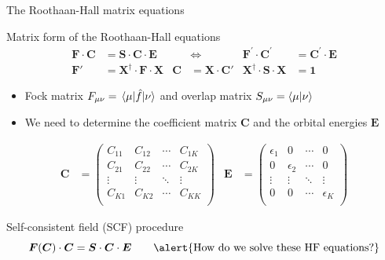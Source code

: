 \documentclass[aspectratio=169,9pt]{beamer}
\newcommand{\bC}{\boldsymbol{C}}
\newcommand{\bE}{\boldsymbol{E}}
\newcommand{\bI}{\boldsymbol{1}}
\newcommand{\bS}{\boldsymbol{S}}
\newcommand{\bF}{\boldsymbol{F}}
\newcommand{\bX}{\boldsymbol{X}}
\newcommand{\hf}{\hat{f}}
\begin{document}
\begin{frame}{The Roothaan-Hall matrix equations}
	\small
	\begin{block}{Matrix form of the Roothaan-Hall equations}
		\begin{align}
			\bF \cdot \bC & = \bS \cdot \bC \cdot \bE 
			&
			& \Leftrightarrow  
			&
			\bF^\prime \cdot \bC^\prime & = \bC^\prime \cdot \bE
			\\
			\bF' & = \bX^\dag \cdot \bF \cdot \bX 
			& 
			\bC & = \bX \cdot  \bC'
			& 
			\bX^\dag \cdot  \bS \cdot  \bX & = \bI
		\end{align}
		\begin{itemize}	
			\item \alert{Fock matrix} $ F_{\mu\nu} = \mel{ \mu }{ \hf }{ \nu }$ and \alert{overlap matrix} $S_{\mu\nu} = \braket{ \mu }{ \nu }$
			\item We need to determine the \alert{coefficient matrix} $\bC$ and the \alert{orbital energies} $\bE$
		\end{itemize}
		\begin{align}
			\bC & = 
			\begin{pmatrix}
				C_{11}	&	C_{12}	&	\cdots	&	C_{1K}	\\
				C_{21}	&	C_{22}	&	\cdots	&	C_{2K}	\\
				\vdots	&	\vdots	&	\ddots	&	\vdots	\\
				C_{K1}	&	C_{K2}	&	\cdots	&	C_{KK}	\\				
			\end{pmatrix}
			&
			\bE & = 
			\begin{pmatrix}
				\epsilon_{1}	&	0			&	\cdots	&	0		\\
				0			&	\epsilon_{2}	&	\cdots	&	0			\\
				\vdots		&	\vdots		&	\ddots	&	\vdots		\\
				0			&	0			&	\cdots	&	\epsilon_{K}	\\				
			\end{pmatrix}		
		\end{align}
	\end{block}
	\begin{block}{Self-consistent field (SCF) procedure}
		\begin{equation}
			\bF(\bC) \cdot \bC 
			= \bS \cdot \bC \cdot \bE
			\qquad \text{\alert{How do we solve these HF equations?}}
		\end{equation}
	\end{block}
\end{frame}
\end{document}
